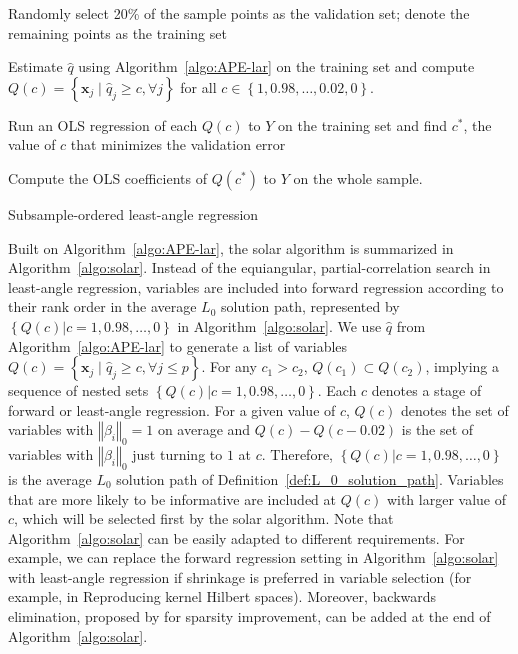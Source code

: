 \documentclass[12pt]{article}
\begin{document}


\begin{algorithm}[h]


  \smallskip
  Randomly select 20\% of the sample points as the validation set; denote the remaining points as the training set\;

  Estimate $\widehat{q}$ using Algorithm~\ref{algo:APE-lar} on the training set and compute $Q(c) = \left\{ \mathbf{x}_j \; \vert \; \widehat{q}_j \geqslant c, \forall j\right\}$ for all $c \in \left\{ 1, 0.98, \ldots, 0.02, 0 \right\}.$

  Run an OLS regression of each $Q(c)$ to $Y$ on the training set and find $c^*$, the value of $c$ that minimizes the validation error\;

  Compute the OLS coefficients of $Q(c^*)$ to $Y$ on the whole sample.

  \caption{Subsample-ordered least-angle regression \label{algo:solar}}
\end{algorithm}

Built on Algorithm~\ref{algo:APE-lar}, the solar algorithm is summarized in Algorithm~\ref{algo:solar}. Instead of the equiangular, partial-correlation search in least-angle regression, variables are included into forward regression according to their rank order in the average $L_0$ solution path, represented by $\left\{ Q(c) \vert c = 1, 0.98, \ldots, 0\right\}$ in Algorithm~\ref{algo:solar}. We use $\widehat{q}$ from Algorithm~\ref{algo:APE-lar} to generate a list of variables $Q \left( c \right) = \left\{ \mathbf{x}_j \; \vert \; \widehat{q}_j \geqslant c, \forall j \leqslant p \right\}$. For any $c_1 > c_2$, $Q\left(c_1\right) \subset Q\left(c_2\right)$, implying a sequence of nested sets $\left\{ Q(c) \vert c = 1, 0.98, \ldots, 0\right\}$. Each $c$ denotes a stage of forward or least-angle regression. For a given value of $c$, $Q(c)$ denotes the set of variables with $\left\Vert \beta_i \right\Vert_0=1$ on average and $Q(c) - Q(c - 0.02)$ is the set of variables with $\left\Vert \beta_i \right\Vert_0$ just turning to $1$ at $c$. Therefore, $\left\{ Q(c) \vert c = 1, 0.98, \ldots, 0\right\}$ is the average $L_0$ solution path of Definition~\ref{def:L_0_solution_path}. Variables that are more likely to be informative are included at $Q(c)$ with larger value of $c$, which will be selected first by the solar algorithm. Note that Algorithm~\ref{algo:solar} can be easily adapted to different requirements. For example, we can replace the forward regression setting in Algorithm~\ref{algo:solar} with least-angle regression if shrinkage is preferred in variable selection (for example, in Reproducing kernel Hilbert spaces). Moreover, backwards elimination, proposed by \citet{zhang09} for sparsity improvement, can be added at the end of Algorithm~\ref{algo:solar}.
\end{document}
